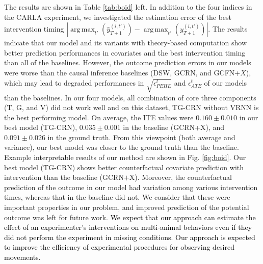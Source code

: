 \documentclass[journal]{IEEEtran}
\DeclareMathOperator*{\argmax}{arg\,max}
\begin{document}

The results are shown in Table \ref{tab:boid} left. 
In addition to the four indices in the CARLA experiment, we investigated the estimation error of the best intervention timing $|\argmax_{t'}(\hat{y}^{(i,t')}_{T+1})-\argmax_{t'}(y^{(i,t')}_{T+1})|$.
The results indicate that our model and its variants with theory-based computation show better prediction performances in covariates and the best intervention timing than all of the baselines.
However, the outcome prediction errors in our models were worse than the causal inference baselines (DSW, GCRN, and GCFN+$X$), which may lead to degraded performances in  $\sqrt{\epsilon^t_{PEHE}}$ and $\epsilon^t_{ATE}$ of our models than the baselines. 
In our four models, all combination of core three components (T, G, and V) did not work well and on this dataset, TG-CRN without VRNN is the best performing model. 
On average, the ITE values were $0.160 \pm 0.010$ in our best model (TG-CRN), $0.035 \pm 0.001$ in the baseline (GCRN+X), and $0.091 \pm 0.026$ in the ground truth.
From this viewpoint (both average and variance), our best model was closer to the ground truth than the baseline. 
Example \textcolor{black}{interpretable} results of our method are shown in Fig. \ref{fig:boid}.
Our best model (TG-CRN) shows better counterfactual covariate prediction with intervention than the baseline (GCRN$+$X).
Moreover, the counterfactual prediction of the outcome in our model had variation among various intervention times, whereas that in the baseline did not.
We consider that these were important properties in our problem, and improved prediction of the potential outcome was left for future work. 
\textcolor{black}{We expect that our approach can estimate the effect of an experimenter’s interventions on multi-animal behaviors even if they did not perform the experiment in missing conditions. Our approach is expected to improve the efficiency of experimental procedures for observing desired movements.}
\end{document}
